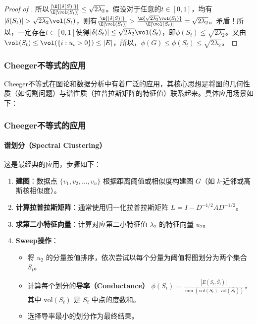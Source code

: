 \documentclass[lang=cn,newtx,10pt,scheme=chinese,chinesefont=nofont,citestyle=gb7714-2015, bibstyle=gb7714-2015]{elegantbook}
\providecommand{\abs}[1]{\lvert#1\rvert}
\begin{document}
\begin{refsection}
\begin{proof}[Proof of ]
所以$\frac{\abs{\E{\abs{\delta(S)}}}}{\E[\vol(S_t)]}\leq\sqrt{2\lambda_2}$。假设对于任意的$t\in[0,1]$，均有$\abs{\delta(S_t)}>\sqrt{2\lambda_2}\vol(S_t)$，则有$\frac{\E{\abs{\delta(S)}}}{\E[\vol(S_t)]}>\frac{\E{\sqrt{2\lambda_2}\vol(S_t)}}{\E[\vol(S_t)]}=\sqrt{2\lambda_2}$。矛盾！所以，一定存在$t\in[0,1]$使得$\abs{\delta(S_t)}\leq\sqrt{2\lambda_2}\vol(S_t)$，即$\phi(S_t)\leq\sqrt{2\lambda_2}$。又由$\vol(S_t)\leq\vol(\{i:u_i>0\})\leq\abs{E}$，所以，$\phi(G)\leq\phi(S_t)\leq\sqrt{2\lambda_2}$。

\end{proof}

\subsubsection{Cheeger不等式的应用}

Cheeger不等式在图论和数据分析中有着广泛的应用，其核心思想是将图的几何性质（如切割问题）与谱性质（拉普拉斯矩阵的特征值）联系起来。具体应用场景如下：

\subsubsection{Cheeger不等式的应用}

\paragraph{谱划分（Spectral Clustering）}
这是最经典的应用，步骤如下：
\begin{enumerate}
    \item \textbf{建图}：数据点 $\{v_1, v_2, \dots, v_n\}$ 根据距离阈值或相似度构建图 $G$（如 $k$-近邻或高斯核相似度）。
    \item \textbf{计算拉普拉斯矩阵}：通常使用归一化拉普拉斯矩阵 $L = I - D^{-1/2} A D^{-1/2}$。
    \item \textbf{求第二小特征向量}：计算对应第二小特征值 $\lambda_2$ 的特征向量 $u_2$。
    \item \textbf{Sweep操作}：
    \begin{itemize}
        \item 将 $u_2$ 的分量按值排序，依次尝试以每个分量为阈值将图划分为两个集合 $S_t$。
        \item 计算每个划分的\textbf{导率（Conductance）} $\phi(S_t) = \frac{|E(S_t, \bar{S_t})|}{\min(\text{vol}(S_t), \text{vol}(\bar{S_t}))}$，其中 $\text{vol}(S_t)$ 是 $S_t$ 中点的度数和。
        \item 选择导率最小的划分作为最终结果。
    \end{itemize}
\end{enumerate}


\end{refsection}
\end{document}
